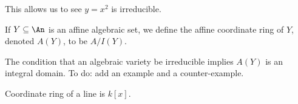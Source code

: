 \begin{example}
This allows us to see $y = x^2$ is irreducible.
\end{example}

\begin{definition}
If $Y \subseteq \An$ is an affine algebraic set, we define the affine coordinate ring of $Y$, denoted $A(Y)$, to be $A/I(Y)$.
\end{definition}

\begin{example}
The condition that an algebraic variety be irreducible implies $A(Y)$ is an integral domain.
To do: add an example and a counter-example.
\end{example}

\begin{example}
Coordinate ring of a line is $k[x]$.
\end{example}
